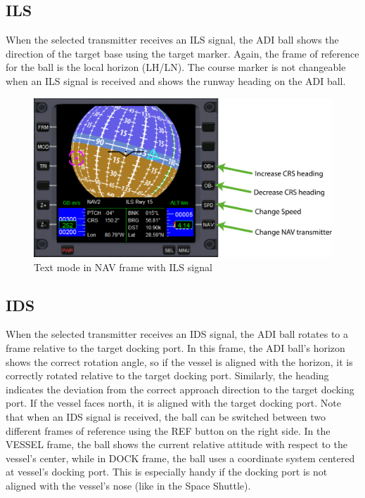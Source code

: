 \documentclass[paper=a4, 11 pt]{report}
\begin{document}
\subsection{ILS}
When the selected transmitter receives an ILS signal, the ADI ball shows the direction of the target base using the target marker.
Again, the frame of reference for the ball is the local horizon (LH/LN).
The course marker is not changeable when an ILS signal is received and shows the runway heading on the ADI ball.

\begin{figure}[h]
	\centering
	\includegraphics[width=\textwidth]{3_ils.pdf}
	\caption{Text mode in NAV frame with ILS signal}
	\label{fig:ils}
\end{figure}

\subsection{IDS}
When the selected transmitter receives an IDS signal, the ADI ball rotates to a frame relative to the target docking port.
In this frame, the ADI ball's horizon shows the correct rotation angle, so if the vessel is aligned with the horizon, it is correctly rotated relative to the target docking port.
Similarly, the heading indicates the deviation from the correct approach direction to the target docking port.
If the vessel faces north, it is aligned with the target docking port.
Note that when an IDS signal is received, the ball can be switched between two different frames of reference using the REF button on the right side.
In the VESSEL frame, the ball shows the current relative attitude with respect to the vessel's center, while in DOCK frame, the ball uses a coordinate system centered at vessel's docking port.
This is especially handy if the docking port is not aligned with the vessel's nose (like in the Space Shuttle).
\end{document}
